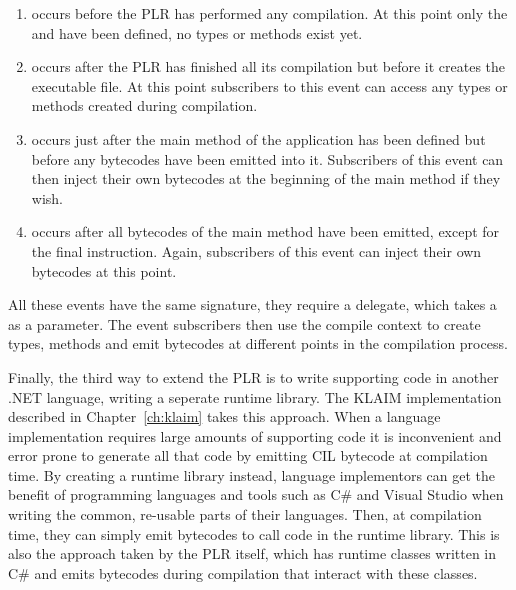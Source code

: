 	\begin{enumerate}
		\item {} occurs before the PLR has performed any 
		compilation. At this point only the  and 
		 have been defined, no types or methods exist yet.
		
		\item {} occurs after the PLR has finished all its
		compilation but before it creates the executable file. At this point
		subscribers to this event can access any types or methods created during
		compilation.
		
		\item {} occurs just after the main method of the
		application has been defined but before any bytecodes have been emitted
		into it. Subscribers of this event can then inject their own bytecodes at 
		the beginning of the main method if they wish.
		
		\item {} occurs after all bytecodes of the main method
		have been emitted, except for the final  instruction. Again, 
		subscribers of this event can inject their own bytecodes at this point.
	\end{enumerate}
	
	All these events have the same signature, they require a 
	 delegate, which takes a  
	as a parameter. The event subscribers then use the compile context to create 
	types, methods and emit bytecodes at different points in the compilation 
	process.
	
	Finally, the third way to extend the PLR is to write supporting code in
	another .NET language, writing a seperate runtime library. The KLAIM 
	implementation described in Chapter~\ref{ch:klaim} takes this approach. When 
	a language implementation requires large amounts of supporting code it is 
	inconvenient and error prone to generate all that code by emitting CIL 
	bytecode at compilation time. By creating a runtime library instead, 
	language implementors can get the benefit of programming languages and tools 
	such as C\# and Visual Studio when writing the common, re-usable parts of 
	their languages. Then, at compilation time, they can simply emit bytecodes 
	to call code in the runtime library. This is also the approach taken by the 
	PLR itself, which has runtime classes written in C\# and emits bytecodes 
	during compilation that interact with these classes.	

